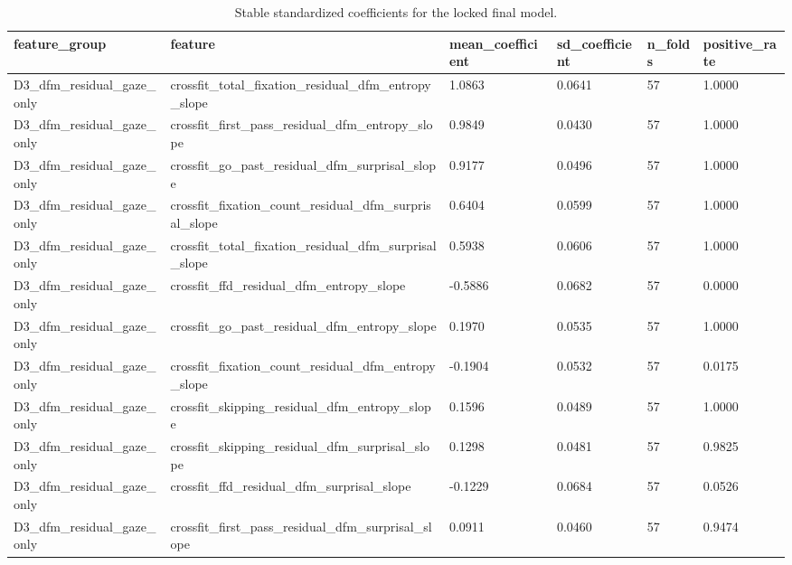 \begin{table}[t]
\centering
\small
\caption{Stable standardized coefficients for the locked final model.}
\label{tab:feature-stability}
\begin{tabular}{llllll}
\toprule
feature\_group & feature & mean\_coefficient & sd\_coefficient & n\_folds & positive\_rate \\
\midrule
D3\_dfm\_residual\_gaze\_only & crossfit\_total\_fixation\_residual\_dfm\_entropy\_slope & 1.0863 & 0.0641 & 57 & 1.0000 \\
D3\_dfm\_residual\_gaze\_only & crossfit\_first\_pass\_residual\_dfm\_entropy\_slope & 0.9849 & 0.0430 & 57 & 1.0000 \\
D3\_dfm\_residual\_gaze\_only & crossfit\_go\_past\_residual\_dfm\_surprisal\_slope & 0.9177 & 0.0496 & 57 & 1.0000 \\
D3\_dfm\_residual\_gaze\_only & crossfit\_fixation\_count\_residual\_dfm\_surprisal\_slope & 0.6404 & 0.0599 & 57 & 1.0000 \\
D3\_dfm\_residual\_gaze\_only & crossfit\_total\_fixation\_residual\_dfm\_surprisal\_slope & 0.5938 & 0.0606 & 57 & 1.0000 \\
D3\_dfm\_residual\_gaze\_only & crossfit\_ffd\_residual\_dfm\_entropy\_slope & -0.5886 & 0.0682 & 57 & 0.0000 \\
D3\_dfm\_residual\_gaze\_only & crossfit\_go\_past\_residual\_dfm\_entropy\_slope & 0.1970 & 0.0535 & 57 & 1.0000 \\
D3\_dfm\_residual\_gaze\_only & crossfit\_fixation\_count\_residual\_dfm\_entropy\_slope & -0.1904 & 0.0532 & 57 & 0.0175 \\
D3\_dfm\_residual\_gaze\_only & crossfit\_skipping\_residual\_dfm\_entropy\_slope & 0.1596 & 0.0489 & 57 & 1.0000 \\
D3\_dfm\_residual\_gaze\_only & crossfit\_skipping\_residual\_dfm\_surprisal\_slope & 0.1298 & 0.0481 & 57 & 0.9825 \\
D3\_dfm\_residual\_gaze\_only & crossfit\_ffd\_residual\_dfm\_surprisal\_slope & -0.1229 & 0.0684 & 57 & 0.0526 \\
D3\_dfm\_residual\_gaze\_only & crossfit\_first\_pass\_residual\_dfm\_surprisal\_slope & 0.0911 & 0.0460 & 57 & 0.9474 \\
\bottomrule
\end{tabular}
\end{table}
